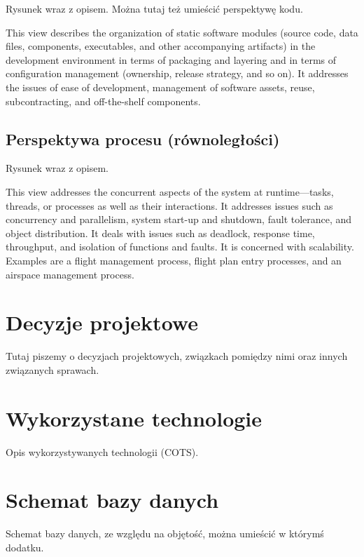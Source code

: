 Rysunek wraz z opisem. Można tutaj też umieścić perspektywę kodu.

This view describes the organization of static software modules (source code, data files, components, executables, and other accompanying artifacts) in the development environment in terms of packaging and layering and in terms of configuration management (ownership, release strategy, and so on). It addresses the issues of ease of development, management of software assets, reuse, subcontracting, and off-the-shelf components.


\subsection{Perspektywa procesu (równoległości)}

Rysunek wraz z opisem.

This view addresses the concurrent aspects of the system at runtime—tasks, threads, or processes as well as their interactions. It addresses issues such as concurrency and parallelism, system start-up and shutdown, fault tolerance, and object distribution. It deals with issues such as deadlock, response time, throughput, and isolation of functions and faults. It is concerned with scalability.
Examples are a flight management process, flight plan entry processes, and an airspace management process.


\section{Decyzje projektowe}
\label{Chapter55}

Tutaj piszemy o decyzjach projektowych, związkach pomiędzy nimi oraz innych związanych sprawach.

\section{Wykorzystane technologie}
\label{Chapter56}

Opis wykorzystywanych technologii (COTS).

\section{Schemat bazy danych}
\label{Chapter57}

Schemat bazy danych, ze względu na objętość, można umieścić w którymś dodatku.